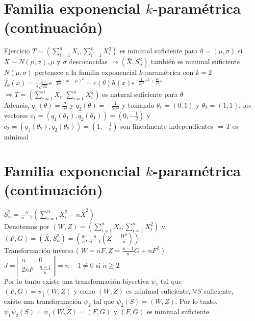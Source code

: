 \section*{Familia exponencial $k$-paramétrica (continuación)}
Ejercicio $T=\left(\sum_{i=1}^{n} X_{i}, \sum_{i=1}^{n} X_{i}^{2}\right)$ es minimal suficiente para $\theta=(\mu, \sigma)$ si $X \sim N(\mu, \sigma), \mu$ y $\sigma$ desconocidas $\Rightarrow\left(\bar{X}, S_{n}^{2}\right)$ también es minimal suficiente\\
$N(\mu, \sigma)$ pertenece a la familia exponencial $k$-paramétrica con $k=2$ $f_{\theta}(x)=\frac{1}{\sigma \sqrt{2 \pi}} e^{-\frac{1}{2 \sigma^{2}}(x-\mu)^{2}}=c(\theta) h(x) e^{-\frac{1}{2 \sigma^{2}} x^{2}+\frac{\mu}{\sigma^{2}} x}$\\
$\Rightarrow T=\left(\sum_{i=1}^{n} X_{i}, \sum_{i=1}^{n} X_{i}^{2}\right)$ es natural suficiente para $\theta$\\
Además, $q_{1}(\theta)=\frac{\mu}{\sigma^{2}}$ y $q_{2}(\theta)=-\frac{1}{2 \sigma^{2}}$ y tomando $\theta_{1}=(0,1)$ y $\theta_{2}=(1,1)$, los vectores $c_{1}=\left(q_{1}\left(\theta_{1}\right), q_{2}\left(\theta_{1}\right)\right)=\left(0,-\frac{1}{2}\right)$ y $c_{2}=\left(q_{1}\left(\theta_{2}\right), q_{2}\left(\theta_{2}\right)\right)=\left(1,-\frac{1}{2}\right)$ son linealmente independientes $\Rightarrow T$ es minimal

\section*{Familia exponencial $k$-paramétrica (continuación)}
$S_{n}^{2}=\frac{n}{n-1}\left(\sum_{i=1}^{n} X_{i}^{2}-n \bar{X}^{2}\right)$\\
Denotemos por $(W, Z)=\left(\sum_{i=1}^{n} X_{i}, \sum_{i=1}^{n} X_{i}^{2}\right)$ y\\
$(F, G)=\left(\bar{X}, S_{n}^{2}\right)=\left(\frac{w}{n}, \frac{n}{n-1}\left(Z-\frac{W^{2}}{n}\right)\right)$\\
Transformación inversa ( $W=n F, Z=\frac{n-1}{n} G+n F^{2}$ )\\
$J=\left|\begin{array}{ll}n & 0 \\ 2 n F & \frac{n-1}{n}\end{array}\right|=n-1 \neq 0$ si $n \geq 2$\\
Por lo tanto existe una transformación biyectiva $\psi_{1}$ tal que $(F, G)=\psi_{1}(W, Z)$ y como $(W, Z)$ es minimal suficiente, $\forall S$ suficiente, existe una transformación $\psi_{2}$ tal que $\psi_{2}(S)=(W, Z)$. Por lo tanto, $\psi_{1} \psi_{2}(S)=\psi_{1}(W, Z)=(F, G)$ y $(F, G)$ es minimal suficiente

